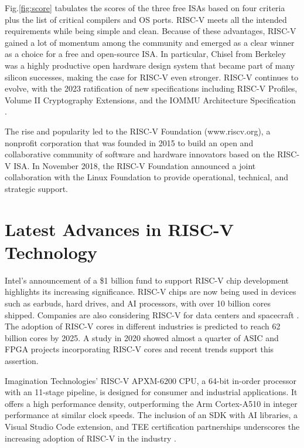\documentclass[journal]{IEEEtran}
\begin{document}
Fig.\ref{fig:score} tabulates the scores of the three free ISAs based on four criteria plus the list of critical compilers and OS ports. RISC-V meets all the intended requirements while being simple and clean. Because of these advantages, RISC-V gained a lot of momentum among the community and emerged as a clear winner as a choice for a free and open-source ISA. In particular, Chisel \cite{bachrach_chisel_2012} from Berkeley was a highly productive open hardware design system that became part of many silicon successes, making the case for RISC-V even stronger. 
RISC-V continues to evolve, with the 2023 ratification of new specifications including RISC-V Profiles, Volume II Cryptography Extensions, and the IOMMU Architecture Specification \cite{mcmahon_risc-v_nodate}.

The rise and popularity led to the RISC-V Foundation (www.riscv.org), a nonprofit corporation that was founded in 2015 to build an open and collaborative community of software and hardware innovators based on the RISC-V ISA. In November 2018, the RISC-V Foundation announced a joint collaboration with the Linux Foundation to provide operational, technical, and strategic support.

\section{Latest Advances in RISC-V Technology}
Intel's announcement of a \$1 billion fund to support RISC-V chip development highlights its increasing significance. RISC-V chips are now being used in devices such as earbuds, hard drives, and AI processors, with over 10 billion cores shipped. Companies are also considering RISC-V for data centers and spacecraft \cite{noauthor_chip_nodate}.
The adoption of RISC-V cores in different industries is predicted to reach 62 billion cores by 2025. A study in 2020 showed almost a quarter of ASIC and FPGA projects incorporating RISC-V cores \cite{redmond_risc-v_2021} and recent trends support this assertion.

Imagination Technologies' RISC-V APXM-6200 CPU, a 64-bit in-order processor with an 11-stage pipeline, is designed for consumer and industrial applications. It offers a high performance density, outperforming the Arm Cortex-A510 in integer performance at similar clock speeds. The inclusion of an SDK with AI libraries, a Visual Studio Code extension, and TEE certification partnerships underscores the increasing adoption of RISC-V in the industry \cite{krewell_imagination_2024}.
\end{document}
